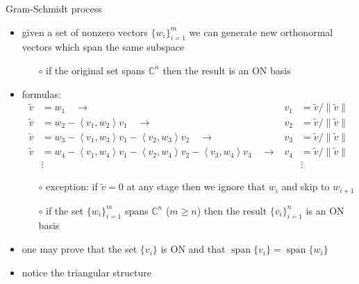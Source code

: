 \documentclass[10pt,hyperref]{beamer}
\newcommand{\CC}{\mathbb{C}}
\newcommand{\ip}[2]{\left<#1,#2\right>}
\begin{document}
\begin{frame}{Gram-Schmidt process}

\begin{itemize}
\item given a set of nonzero vectors $\{w_i\}_{i=1}^m$ we can generate new orthonormal vectors which span the same subspace
    \begin{itemize}
    \item[$\circ$] if the original set spans $\CC^n$ then the result is an ON basis
    \end{itemize}
\item formulas:
\begin{align*}
\tilde v &= w_1 \quad \to & v_1 &= \tilde v/\|\tilde v\| \\
\tilde v &= w_2 - \ip{v_1}{w_2} v_1 \quad \to & v_2 &= \tilde v/\|\tilde v\| \\
\tilde v &= w_3 - \ip{v_1}{w_3} v_1 - \ip{v_2}{w_3} v_2 \quad \to & v_3 &= \tilde v/\|\tilde v\| \\
\tilde v &= w_4 - \ip{v_1}{w_4} v_1 - \ip{v_2}{w_4} v_2 - \ip{v_3}{w_4} v_3 \quad \to & v_4 &= \tilde v/\|\tilde v\| \\
&\vdots & &\vdots
\end{align*}
\vspace{-4mm}
    \begin{itemize}
    \item[$\circ$] exception: if $\tilde v=0$ at any stage then we ignore that $w_i$ and skip to $w_{i+1}$
    \item[$\circ$] if the set $\{w_i\}_{i=1}^m$ spans $\CC^n$ ($m\ge n$) then the result $\{v_i\}_{i=1}^n$ is an ON basis
    \end{itemize}
\item one may prove that the set $\{v_i\}$ is ON and that $\operatorname{span}\{v_i\} = \operatorname{span}\{w_i\}$
\item notice the triangular structure
\end{itemize}
\end{frame}
\end{document}
